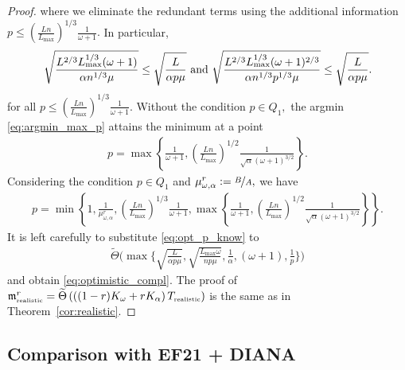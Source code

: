 \documentclass{article} %
\theoremstyle{plain}
\theoremstyle{definition}
\theoremstyle{remark}
\newcommand{\eqdef}{:=}
\newcommand{\green}{\color{mydarkgreen}}
\newcommand{\algname}[1]{{\small\green\sf #1}}
\begin{document}
\begin{proof}
  where we eliminate the redundant terms using the additional information $p \leq \left(\frac{L n}{L_{\max}}\right)^{1/3} \frac{1}{\omega + 1}.$ In particular,
  \begin{align*}
    \sqrt{\frac{L^{2/3} L_{\max}^{1/3} (\omega + 1)}{\alpha n^{1/3} \mu}} \leq \sqrt{\frac{L}{\alpha p \mu}} \textnormal{ and } \sqrt{\frac{L^{2/3} L_{\max}^{1/3} (\omega + 1)^{2/3}}{\alpha n^{1/3} p^{1/3} \mu}} \leq \sqrt{\frac{L}{\alpha p \mu}}.
  \end{align*}
  for all $p \leq \left(\frac{L n}{L_{\max}}\right)^{1/3} \frac{1}{\omega + 1}.$ 
  Without the condition $p \in Q_1,$ the argmin \eqref{eq:argmin_max_p} attains the minimum at a point 
  \begin{align*}
    p = \max\left\{\frac{1}{\omega + 1}, \left(\frac{L n}{L_{\max}}\right)^{1/2}\frac{1}{\sqrt{\alpha} (\omega + 1)^{3/2}}\right\}.
  \end{align*}
  Considering the condition $p \in Q_1$ and $\mu^r_{\omega, \alpha} \eqdef \nicefrac{B}{A},$ we have
  \begin{align}
    \label{eq:opt_p_know}
    p = \min\left\{1, \frac{1}{\mu^r_{\omega, \alpha}}, \left(\frac{L n}{L_{\max}}\right)^{1/3} \frac{1}{\omega + 1}, \max\left\{\frac{1}{\omega + 1}, \left(\frac{L n}{L_{\max}}\right)^{1/2}\frac{1}{\sqrt{\alpha} (\omega + 1)^{3/2}}\right\}\right\}.
  \end{align}
  It is left carefully to substitute \eqref{eq:opt_p_know} to 
  \begin{align*}
    \widetilde{\Theta}\Bigg(\max\Bigg\{\sqrt{\frac{L}{\alpha p \mu}}, \sqrt{\frac{L_{\max} \omega}{n p \mu}}, \frac{1}{\alpha}, (\omega + 1), \frac{1}{p}\Bigg\}\Bigg)
  \end{align*}
  and obtain \eqref{eq:optimistic_compl}.
  The proof of $\mathfrak{m}^{r}_{{\scriptscriptstyle \textnormal{realistic}}} = \widetilde{\Theta}\left(\left((1 - r)K_{\omega} + r K_{\alpha}\right) T_{{\scriptscriptstyle \textnormal{realistic}}}\right)$ is the same as in Theorem~\ref{cor:realistic}.
\end{proof}


\subsection{Comparison with \algname{EF21 + DIANA}}
\label{sec:compare_ef21}
\THEOREMBETTEREF*
\end{document}
